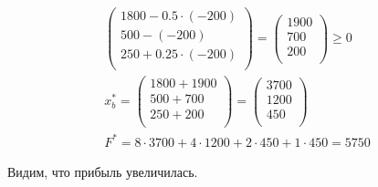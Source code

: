 \documentclass[17pt]{extarticle}
\begin{document}
\[
    \begin{split}
        \begin{pmatrix}
            1800 - 0.5 \cdot (-200) \\
            500 - (-200)            \\
            250 + 0.25 \cdot (-200) \\
        \end{pmatrix} =
        \begin{pmatrix}
            1900 \\
            700  \\
            200  \\
        \end{pmatrix} \geq 0 \\
        x^*_b = \begin{pmatrix}
            1800 + 1900 \\
            500 + 700   \\
            250 + 200   \\
        \end{pmatrix} = \begin{pmatrix}
            3700 \\
            1200 \\
            450  \\
        \end{pmatrix} \\
        F^* = 8 \cdot 3700 + 4 \cdot 1200 + 2 \cdot 450 + 1 \cdot 450 = 5750
    \end{split}
\]

Видим, что прибыль увеличилась.
\end{document}
